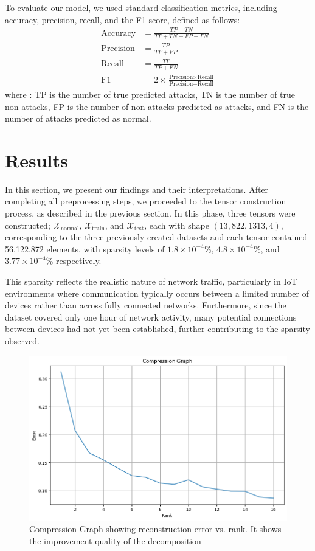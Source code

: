 \documentclass[preprint,12pt,authoryear]{elsarticle}
\begin{document}
To evaluate our model, we used standard classification metrics, including accuracy, precision, recall, and the F1-score, defined as follows:
\begin{align}
\text{Accuracy} &= \frac{TP + TN}{TP + TN + FP + FN}\\
\text{Precision} &= \frac{TP}{TP + FP}\\
\text{Recall} &= \frac{TP}{TP + FN}\\
\text{F1} &= 2 \times \frac{\text{Precision} \times \text{Recall}}{\text{Precision} + \text{Recall}}
\end{align}
where :
 TP is the number of true predicted attacks,
TN  is the number of true non attacks,
FP is the number of non attacks predicted as attacks, and 
FN is the number of attacks predicted as normal.






\section{Results}
In this section, we present our findings and their interpretations.   After completing all preprocessing steps, we proceeded to the tensor construction process, as described in the previous section. In this phase, three tensors were constructed; $\mathcal{X}_{\text{normal}}$, $\mathcal{X}_{\text{train}}$, and $\mathcal{X}_{\text{test}}$, each with shape $(13, 822, 1313, 4)$, corresponding to the three previously created datasets and each tensor contained 56,122,872 elements, with sparsity levels of $1.8 \times 10^{-4}\%$, $4.8 \times 10^{-4}\%$, and $3.77 \times 10^{-4}\%$ respectively. 

This sparsity reflects the realistic nature of network traffic, particularly in IoT environments where communication typically occurs between a limited number of devices rather than across fully connected networks. Furthermore, since the dataset covered only one hour of network activity, many potential connections between devices had not yet been established, further contributing to the sparsity observed. 
\begin{figure}
    \centering
    \includegraphics[width=.8\textwidth]{Compression Graph.png}
    \caption{Compression Graph showing reconstruction error vs. rank. It shows the improvement quality of the decomposition}
    \label{fig:Compression graph}
\end{figure}
\end{document}
